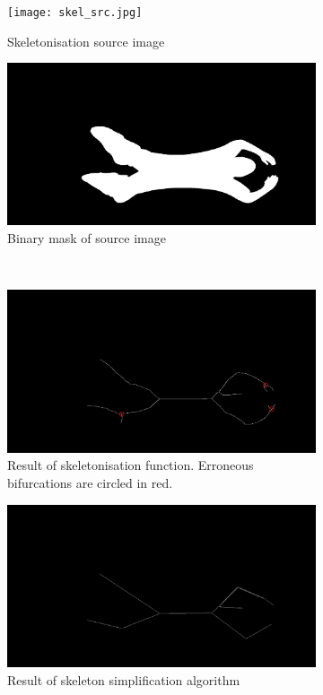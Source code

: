 \documentclass[a4paper, 12pt]{article}
\begin{document}
\begin{figure}[H]
	\centering
	\begin{subfigure}{.5\textwidth}
  		\centering
  		\texttt{[image: skel\_src.jpg]}
  		\caption{Skeletonisation source image}
  		\label{fig:skel_src}
	\end{subfigure}%
	\begin{subfigure}{.5\textwidth}
  		\centering
  		\includegraphics[width=.95\linewidth]{skel_src_mask.jpg}
  		\caption{Binary mask of source image}
  		\label{fig:skel_src_mask}
	\end{subfigure}\\
	\begin{subfigure}{.5\textwidth}
  		\centering
  		\includegraphics[width=.95\linewidth]{skel.jpg}
  		\caption{Result of skeletonisation function. Erroneous bifurcations are circled in red.}
  		\label{fig:skel}
	\end{subfigure}%
	\begin{subfigure}{.5\textwidth}
  		\centering
  		\includegraphics[width=.95\linewidth]{skel_reduced.jpg}
  		\caption{Result of skeleton simplification algorithm}
  		\label{fig:skel_reduced}
	\end{subfigure}
\caption{}
\end{figure}
%
\end{document}
